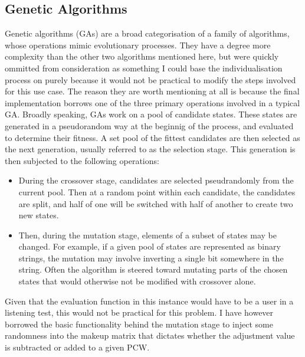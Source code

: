 \subsection{Genetic Algorithms}
Genetic algorithms (GAs) \citep{Whitley1994} are a broad categorisation of a family of algorithms, whose operations mimic evolutionary processes. They have a degree more complexity than the other two algorithms mentioned here, but were quickly ommitted from consideration as something I could base the individualisation process on purely because it would not be practical to modify the steps involved for this use case. The reason they are worth mentioning at all is because the final implementation borrows one of the three primary operations involved in a typical GA. Broadly speaking, GAs work on a pool of candidate states. These states are generated in a pseudorandom way at the beginnig of the process, and evaluated to determine their fitness. A set pool of the fittest candidates are then selected as the next generation, usually referred to as the selection stage. This generation is then subjected to the following operations: 
\begin{itemize}
\item During the crossover stage, candidates are selected pseudrandomly from the current pool. Then at a random point within each candidate, the candidates are split, and half of one will be switched with half of another to create two new states. 
\item Then, during the mutation stage, elements of a subset of states may be changed. For example, if a given pool of states are represented as binary strings, the mutation may involve inverting a single bit somewhere in the string. Often the algorithm is steered toward mutating parts of the chosen states that would otherwise not be modified with crossover alone. 
\end{itemize}
Given that the evaluation function in this instance would have to be a user in a listening test, this would not be practical for this problem. I have however borrowed the basic functionality behind the mutation stage to inject some randomness into the makeup matrix that dictates whether the adjustment value is subtracted or added to a given PCW.


